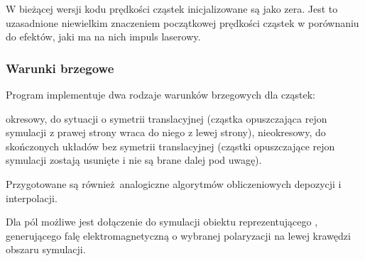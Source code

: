 W bieżącej wersji kodu prędkości cząstek inicjalizowane są jako zera. Jest to
uzasadnione niewielkim znaczeniem początkowej prędkości cząstek w
porównaniu do efektów, jaki ma na nich impuls laserowy.







\subsubsection{Warunki brzegowe}
Program implementuje dwa rodzaje warunków brzegowych dla cząstek:
\begin{itemize}
\itemi{} okresowy, do sytuacji o symetrii translacyjnej (cząstka opuszczająca rejon symulacji z prawej strony wraca do niego z lewej strony),
\itemi{} nieokresowy, do skończonych układów bez symetrii translacyjnej (cząstki opuszczające rejon symulacji zostają usunięte i nie są brane
dalej pod uwagę).
\end{itemize}

Przygotowane są również analogiczne  
algorytmów obliczeniowych depozycji i interpolacji.

Dla pól możliwe jest dołączenie do symulacji obiektu reprezentującego ,
generującego falę elektromagnetyczną o wybranej polaryzacji na lewej krawędzi obszaru symulacji.
